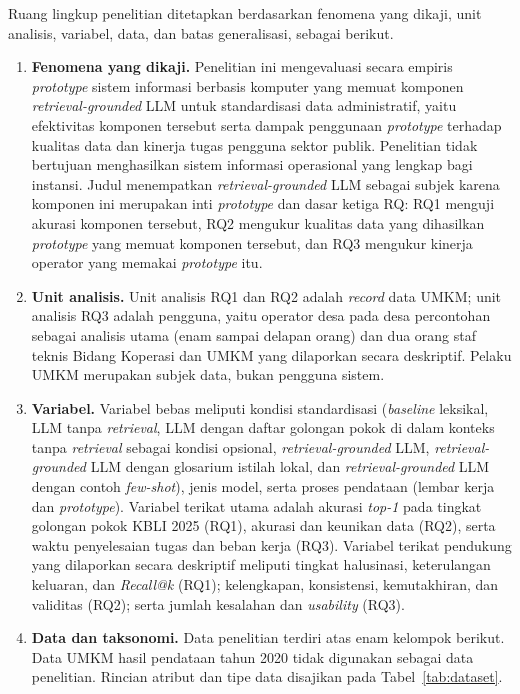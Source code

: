 Ruang lingkup penelitian ditetapkan berdasarkan fenomena yang dikaji, unit analisis, variabel, data, dan batas generalisasi, sebagai berikut.

\begin{enumerate}[label=\arabic*., leftmargin=*]
  \item \textbf{Fenomena yang dikaji.} Penelitian ini mengevaluasi secara empiris \textit{prototype} sistem informasi berbasis komputer yang memuat komponen \textit{retrieval-grounded} LLM untuk standardisasi data administratif, yaitu efektivitas komponen tersebut serta dampak penggunaan \textit{prototype} terhadap kualitas data dan kinerja tugas pengguna sektor publik. Penelitian tidak bertujuan menghasilkan sistem informasi operasional yang lengkap bagi instansi. Judul menempatkan \textit{retrieval-grounded} LLM sebagai subjek karena komponen ini merupakan inti \textit{prototype} dan dasar ketiga RQ: RQ1 menguji akurasi komponen tersebut, RQ2 mengukur kualitas data yang dihasilkan \textit{prototype} yang memuat komponen tersebut, dan RQ3 mengukur kinerja operator yang memakai \textit{prototype} itu.
  \item \textbf{Unit analisis.} Unit analisis RQ1 dan RQ2 adalah \textit{record} data UMKM; unit analisis RQ3 adalah pengguna, yaitu operator desa pada desa percontohan sebagai analisis utama (enam sampai delapan orang) dan dua orang staf teknis Bidang Koperasi dan UMKM yang dilaporkan secara deskriptif. Pelaku UMKM merupakan subjek data, bukan pengguna sistem.
  \item \textbf{Variabel.} Variabel bebas meliputi kondisi standardisasi (\textit{baseline} leksikal, LLM tanpa \textit{retrieval}, LLM dengan daftar golongan pokok di dalam konteks tanpa \textit{retrieval} sebagai kondisi opsional, \textit{retrieval-grounded} LLM, \textit{retrieval-grounded} LLM dengan glosarium istilah lokal, dan \textit{retrieval-grounded} LLM dengan contoh \textit{few-shot}), jenis model, serta proses pendataan (lembar kerja dan \textit{prototype}). Variabel terikat utama adalah akurasi \textit{top-1} pada tingkat golongan pokok KBLI 2025 (RQ1), akurasi dan keunikan data (RQ2), serta waktu penyelesaian tugas dan beban kerja (RQ3). Variabel terikat pendukung yang dilaporkan secara deskriptif meliputi tingkat halusinasi, keterulangan keluaran, dan \textit{Recall@k} (RQ1); kelengkapan, konsistensi, kemutakhiran, dan validitas (RQ2); serta jumlah kesalahan dan \textit{usability} (RQ3).
  \item \textbf{Data dan taksonomi.} Data penelitian terdiri atas enam kelompok berikut. Data UMKM hasil pendataan tahun 2020 tidak digunakan sebagai data penelitian. Rincian atribut dan tipe data disajikan pada Tabel~\ref{tab:dataset}.

\end{enumerate}
